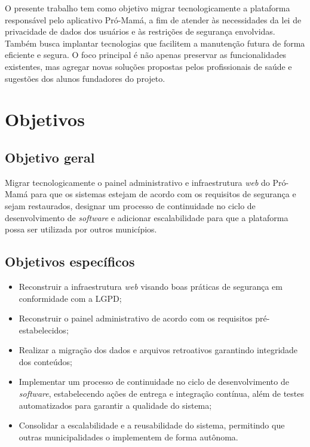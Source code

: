 O presente trabalho tem como objetivo migrar tecnologicamente a plataforma responsável pelo aplicativo Pró-Mamá, a fim de atender às necessidades da lei de privacidade de dados dos usuários e às restrições de segurança envolvidas. Também busca implantar tecnologias que facilitem a manutenção futura de forma eficiente e segura. O foco principal é não apenas preservar as funcionalidades existentes, mas agregar novas soluções propostas pelos profissionais de saúde e sugestões dos alunos fundadores do projeto.

\section{Objetivos}

\subsection{Objetivo geral}

Migrar tecnologicamente o painel administrativo e infraestrutura \emph{web} do Pró-Mamá para que os sistemas estejam de acordo com os requisitos de segurança e sejam restaurados, designar um processo de continuidade no ciclo de desenvolvimento de \emph{software} e adicionar escalabilidade para que a plataforma possa ser utilizada por outros municípios.

\subsection{Objetivos específicos}

\begin{itemize}
  \item Reconstruir a infraestrutura \emph{web} visando boas práticas de segurança em conformidade com a LGPD;
  \item Reconstruir o painel administrativo de acordo com os requisitos pré-estabelecidos;
  \item Realizar a migração dos dados e arquivos retroativos garantindo integridade dos conteúdos;
  \item Implementar um processo de continuidade no ciclo de desenvolvimento de \emph{software}, estabelecendo ações de entrega e integração contínua, além de testes automatizados para garantir a qualidade do sistema;
  \item Consolidar a escalabilidade e a reusabilidade do sistema, permitindo que outras municipalidades o implementem de forma autônoma.
\end{itemize}

